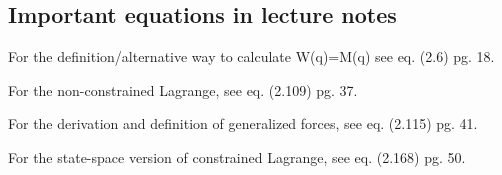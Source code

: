 \subsection{Important equations in lecture notes}

For the definition/alternative way to calculate W(q)=M(q) see eq. (2.6) pg. 18. 

For the non-constrained Lagrange, see eq. (2.109) pg. 37.

For the derivation and definition of generalized forces, see eq. (2.115) pg. 41. 

For the state-space version of constrained Lagrange, see eq. (2.168) pg. 50. 